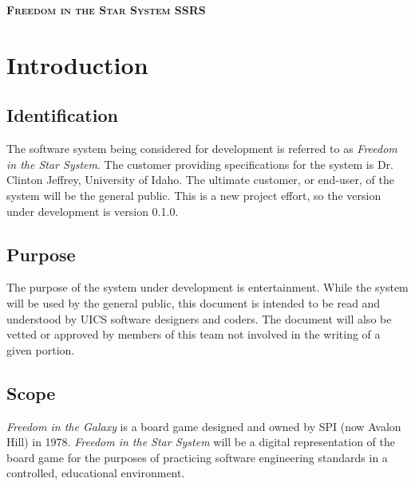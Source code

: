 \documentclass[twoside,letterpaper]{article}
\begin{document}
\clearpage
\begin{minipage}{\linewidth}
\centering
\textsc{
	\textbf{Freedom in the Star System SSRS}}

\vspace{2em}



\end{minipage}

\setcounter{tocdepth}{9}
\renewcommand\contentsname{\centering\textsc{\textbf{Table of Contents}}}
\tableofcontents


\section{Introduction}
\subsection{Identification}
The software system being considered for development is referred to as \textit{Freedom in the Star System}.  The customer providing specifications for the system is Dr. Clinton Jeffrey, University of Idaho.  The ultimate customer, or end-user, of the system will be the general public.  This is a new project effort, so the version under development is version 0.1.0.
\subsection{Purpose}
The purpose of the system under development is entertainment.  While the system will be used by the general public, this document is intended to be read and understood by UICS software
designers and coders. The document will also be vetted or approved by members of this team not involved in the writing of a given portion.
\subsection{Scope}
\textit{Freedom in the Galaxy} is a board game designed and owned by SPI (now Avalon Hill) in 1978.  \textit{Freedom in the Star System} will be a digital representation of the board game for the purposes of practicing software engineering standards in a controlled, educational environment.
\end{document}
